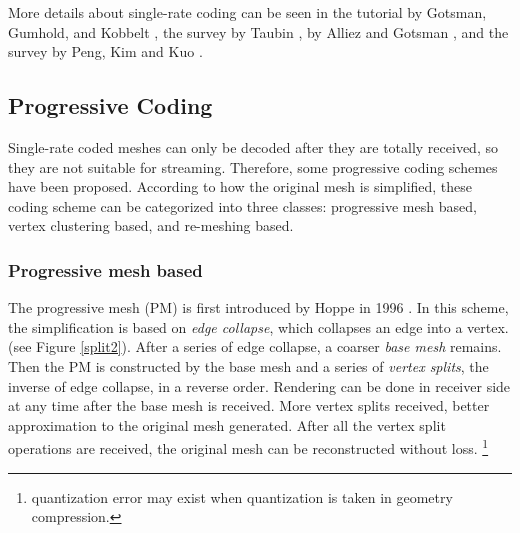 \documentclass[11pt, a4paper]{report}
\begin{document}
    More details about single-rate coding can be seen in the tutorial
    by Gotsman, Gumhold, and Kobbelt \cite{gotsman-simplification},
    the survey by Taubin \cite{3d:Taubin}, by Alliez and Gotsman
    \cite{recent:alliez}, and the survey by Peng, Kim and Kuo
    \cite{technologies:peng}.
    \subsection{Progressive Coding}
    Single-rate coded meshes can only be decoded after they are
    totally received, so they are not suitable for streaming. Therefore,
    some progressive coding schemes have been proposed. According to
    how the original mesh is simplified, these coding scheme can be
    categorized into three classes: progressive mesh based, vertex
    clustering based, and re-meshing based.

    \subsubsection*{Progressive mesh based}
    The progressive mesh (PM) \label{progressive_mesh}is first
    introduced by Hoppe in 1996 \cite{hoppe96progressive}. In this
    scheme, the simplification is based on \emph{edge collapse}, which
    collapses an edge into a vertex.
    (see Figure \ref{split2}).
    After a series of edge collapse, a coarser \emph{base mesh} remains. 
    Then the PM is constructed by the base mesh and a series of \emph{vertex
    splits}, the inverse of edge collapse, in a reverse order.
    Rendering can be done in receiver side at any time after the base
    mesh is received. More vertex splits received, better
    approximation to the original mesh generated. After all
    the vertex split operations are received, the original mesh can be
    reconstructed without loss. \footnote{quantization error may exist
    when quantization is taken in geometry compression.}
\end{document}
